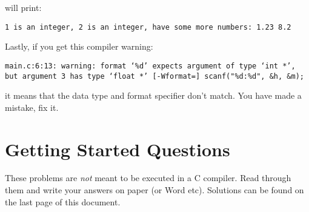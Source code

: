 \documentclass{lab}
\begin{document}
will print:

\texttt{1 is an integer, 2 is an integer, have some more numbers: 1.23 8.2}

Lastly, if you get this compiler warning:


\texttt{main.c:6:13: warning: format ‘\%d’ expects argument of type ‘int *’, but argument 3 has type ‘float *’ [-Wformat=]
  scanf("\%d:\%d", \&h, \&m);}


it means that the data type and format specifier don't match. You have made a mistake, fix it.

\pagebreak
\section{Getting Started Questions}

These problems are \textit{not} meant to be executed in a C compiler. Read through them and write your answers on paper (or Word etc). Solutions can be found on the last page of this document.
\end{document}
